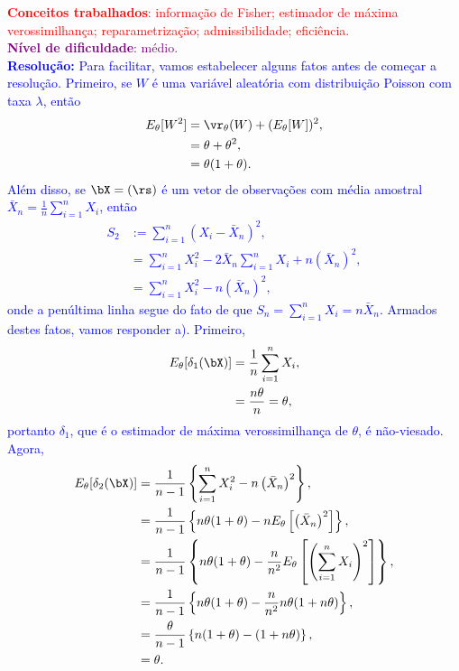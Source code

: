 \textcolor{red}{\textbf{Conceitos trabalhados}: informação de Fisher; estimador de máxima verossimilhança; reparametrização; admissibilidade; eficiência.}\\ \textcolor{purple}{\textbf{Nível de dificuldade}: médio.}\\
\textcolor{blue}{
\textbf{Resolução:}
Para facilitar, vamos estabelecer alguns fatos antes de começar a resolução.
Primeiro, se $W$ é uma variável aleatória com distribuição Poisson com taxa $\lambda$, então
\begin{align*}
    E_\theta[W^2] &= \vr_\theta(W) + (E_\theta[W])^2,\\
    &= \theta + \theta^2,\\
    & = \theta(1+ \theta).
\end{align*}
Além disso, se $\bX = (\rs)$ é um vetor de observações com média amostral $\bar{X}_n =  \frac{1}{n}\sum_{i=1}^n X_i$, então
\begin{align*}
    S_2 &:= \sum_{i=1}^n \left(X_i -\bar{X}_n\right)^2,\\
    & = \sum_{i=1}^n X_i^2 - 2 \bar{X}_n \sum_{i=1}^n X_i  + n\left(\bar{X}_n\right)^2,\\
    &= \sum_{i=1}^n X_i^2  -n\left(\bar{X}_n\right)^2,
\end{align*}
onde a penúltima linha segue do fato de que $S_n = \sum_{i=1}^n X_i = n \bar{X}_n$.
Armados destes fatos, vamos responder a).
Primeiro,
\begin{align*}
    E_\theta[\delta_1(\bX)] &= \frac{1}{n}\sum_{i=1}^n X_i,\\
    &= \frac{n\theta}{n} = \theta,
\end{align*}
portanto $\delta_1$, que é o estimador de máxima verossimilhança de $\theta$, é não-viesado.
Agora,
\begin{align*}
    E_\theta[\delta_2(\bX)] &= \frac{1}{n-1}\left\{\sum_{i=1}^n X_i^2 -n\left(\bar{X}_n\right)^2\right\},\\
    &= \frac{1}{n-1}\left\{n\theta(1+\theta) -nE_\theta\left[\left(\bar{X}_n\right)^2\right]\right\},\\
    & = \frac{1}{n-1}\left\{n\theta(1+\theta) -\frac{n}{n^2}E_\theta\left[\left(\sum_{i=1}^n X_i \right)^2\right]\right\},\\
    &= \frac{1}{n-1}\left\{n\theta(1+\theta) -\frac{n}{n^2}n\theta(1 + n\theta)\right\},\\
    &= \frac{\theta}{n-1}\left\{n(1+\theta) -(1 + n\theta)\right\},\\
    &= \theta.
\end{align*}
}
